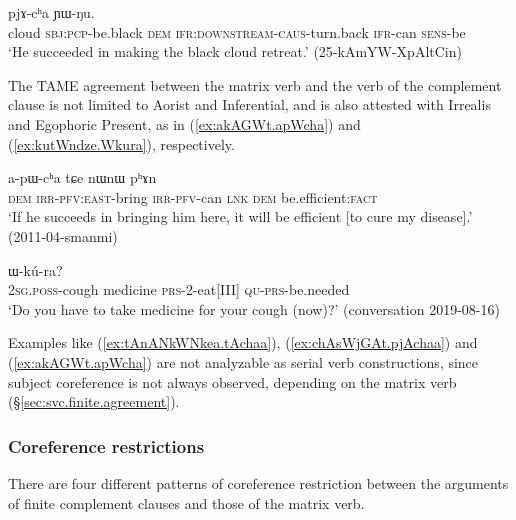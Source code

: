 \begin{exe}
\ex \label{ex:chAsWjGAt.pjAchaa}
  pjɤ-cʰa ɲɯ-ŋu. \\
 cloud \textsc{sbj}:\textsc{pcp}-be.black \textsc{dem} \textsc{ifr}:\textsc{downstream}-\textsc{caus}-turn.back \textsc{ifr}-can \textsc{sens}-be \\
 \glt `He succeeded in making the black cloud retreat.' (25-kAmYW-XpAltCin)
 \end{exe}
 
The TAME agreement between the matrix verb and the verb of the complement clause is not limited to Aorist and Inferential, and is also attested with Irrealis and Egophoric Present, as in (\ref{ex:akAGWt.apWcha}) and (\ref{ex:kutWndze.Wkura}), respectively.

\begin{exe}
\ex \label{ex:akAGWt.apWcha}
  a-pɯ-cʰa tɕe nɯnɯ pʰɤn \\
 \textsc{dem} \textsc{irr}-\textsc{pfv}:\textsc{east}-bring \textsc{irr}-\textsc{pfv}-can \textsc{lnk} \textsc{dem} be.efficient:\textsc{fact} \\
 \glt `If he succeeds in bringing him here, it will be efficient [to cure my disease].' (2011-04-smanmi)
 \end{exe}
 
\begin{exe}
\ex \label{ex:kutWndze.Wkura}
  ɯ-kú-ra? \\
 \textsc{2sg}.\textsc{poss}-cough medicine \textsc{prs}-2-eat[III] \textsc{qu}-\textsc{prs}-be.needed \\
 \glt `Do you have to take medicine for your cough (now)?' (conversation 2019-08-16)
 \end{exe} 
 
 Examples like (\ref{ex:tAnANkWNkea.tAchaa}), (\ref{ex:chAsWjGAt.pjAchaa}) and (\ref{ex:akAGWt.apWcha}) are not analyzable as serial verb constructions, since subject coreference is not always observed, depending on the matrix verb (§\ref{sec:svc.finite.agreement}).
 
 \subsubsection{Coreference restrictions} \label{sec:finite.complement.coref}
There are four different patterns of coreference restriction between the arguments of finite complement clauses and those of the matrix verb.

